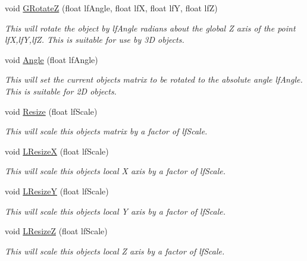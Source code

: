 \begin{DoxyCompactItemize}
void \hyperlink{classc_camera_matrix4_a8c99ce20f8594e9a66e0a7b2830ec9e9}{GRotateZ} (float lfAngle, float lfX, float lfY, float lfZ)
\begin{DoxyCompactList}\small\item\em This will rotate the object by lfAngle radians about the global Z axis of the point lfX,lfY,lfZ. This is suitable for use by 3D objects. \item\end{DoxyCompactList}\item 
void \hyperlink{classc_camera_matrix4_a6be0f1f82cc4ee5a5953cb3b569b4285}{Angle} (float lfAngle)
\begin{DoxyCompactList}\small\item\em This will set the current objects matrix to be rotated to the absolute angle lfAngle. This is suitable for 2D objects. \item\end{DoxyCompactList}\item 
void \hyperlink{classc_camera_matrix4_a620ba52edfd711f011d43a441eece9bc}{Resize} (float lfScale)
\begin{DoxyCompactList}\small\item\em This will scale this objects matrix by a factor of lfScale. \item\end{DoxyCompactList}\item 
void \hyperlink{classc_camera_matrix4_a53c3d81781d403c9bf9671879f79a838}{LResizeX} (float lfScale)
\begin{DoxyCompactList}\small\item\em This will scale this objects local X axis by a factor of lfScale. \item\end{DoxyCompactList}\item 
void \hyperlink{classc_camera_matrix4_a12eda8948b16c1a2818093016d8ef755}{LResizeY} (float lfScale)
\begin{DoxyCompactList}\small\item\em This will scale this objects local Y axis by a factor of lfScale. \item\end{DoxyCompactList}\item 
void \hyperlink{classc_camera_matrix4_a6f1fbcfe585f86002cb586eab9df7c7d}{LResizeZ} (float lfScale)
\begin{DoxyCompactList}\small\item\em This will scale this objects local Z axis by a factor of lfScale. \item\end{DoxyCompactList}\item 

\end{DoxyCompactItemize}
